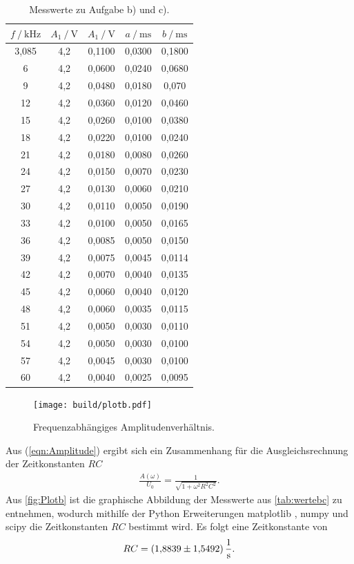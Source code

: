 \begin{table}[H]
    \centering
    \caption{Messwerte zu Aufgabe b) und c).}
    \label{tab:wertebc}
    \begin{tabular}{c c c c c}
        \toprule
        $f \:/\:\si{\kilo\hertz}$ & $A_1 \:/\: \si{\volt}$ & $A_1 \:/\: \si{\volt}$ & $a \:/\: \si{\milli\second}$ & $b \:/\: \si{\milli\second}$ \\
        \midrule
        3,085 & 4,2 & 0,1100 & 0,0300 & 0,1800 \\
        6 & 4,2 & 0,0600 & 0,0240 & 0,0680 \\
        9 & 4,2 & 0,0480 & 0,0180 & 0,070 \\
        12 & 4,2 & 0,0360 & 0,0120 & 0,0460 \\
        15 & 4,2 & 0,0260 & 0,0100 & 0,0380 \\
        18 & 4,2 & 0,0220 & 0,0100 & 0,0240 \\
        21 & 4,2 & 0,0180 & 0,0080 & 0,0260 \\
        24 & 4,2 & 0,0150 & 0,0070 & 0,0230 \\
        27 & 4,2 & 0,0130 & 0,0060 & 0,0210 \\
        30 & 4,2 & 0,0110 & 0,0050 & 0,0190 \\
        33 & 4,2 & 0,0100 & 0,0050 & 0,0165 \\
        36 & 4,2 & 0,0085 & 0,0050 & 0,0150 \\
        39 & 4,2 & 0,0075 & 0,0045 & 0,0114 \\
        42 & 4,2 & 0,0070 & 0,0040 & 0,0135 \\
        45 & 4,2 & 0,0060 & 0,0040 & 0,0120 \\
        48 & 4,2 & 0,0060 & 0,0035 & 0,0115 \\
        51 & 4,2 & 0,0050 & 0,0030 & 0,0110 \\
        54 & 4,2 & 0,0050 & 0,0030 & 0,0100 \\
        57 & 4,2 & 0,0045 & 0,0030 & 0,0100 \\
        60 & 4,2 & 0,0040 & 0,0025 & 0,0095 \\
        \bottomrule
    \end{tabular}
\end{table}


\begin{figure}[H]
    \centering
    \texttt{[image: build/plotb.pdf]}
    \caption{Frequenzabhängiges Amplitudenverhältnis.}
    \label{fig:Plotb}
\end{figure}
Aus (\ref{eqn:Amplitude}) ergibt sich ein Zusammenhang für die Ausgleichsrechnung der Zeitkonstanten $RC$
\begin{align}
    \frac{A(\omega)}{U_0} = \frac{1}{\sqrt{1+\omega^2R^2C^2}}.
    \label{eqn:ausgl}
\end{align}
Aus \autoref{fig:Plotb} ist die graphische Abbildung der Messwerte aus \autoref{tab:wertebc} zu entnehmen, wodurch mithilfe der Python
Erweiterungen matplotlib \cite{matplotlib}, numpy \cite{numpy} und scipy \cite{scipy} die Zeitkonstanten $RC$ bestimmt wird.
Es folgt eine Zeitkonstante von
\begin{align*}
    RC = \SI{1.8839 (1.5492)}{\per\second}.
\end{align*}

